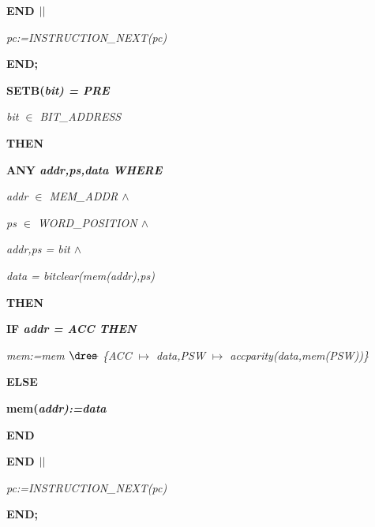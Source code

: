 \begin{sloppypar}
\hspace*{0.20in}\bf END  $\mbox{$\mid\mid$}$ 

\hspace*{0.20in}\it pc\rm :=\it INSTRUCTION\_NEXT\rm (\it pc\rm )

\hspace*{0.10in}\bf END\rm ;

\hspace*{0.10in}\bf SETB\rm (\it bit\rm ) \rm = \bf PRE

\hspace*{0.20in}\it bit $\in$  \it BIT\_ADDRESS

\hspace*{0.10in}\bf THEN

\hspace*{0.20in}\bf ANY \it addr\rm ,\it ps\rm ,\it data \bf WHERE

\hspace*{0.30in}\it addr $\in$  \it MEM\_ADDR  $\land$ 

\hspace*{0.30in}\it ps $\in$  \it WORD\_POSITION  $\land$ 

\hspace*{0.30in}\it addr\rm ,\it ps \rm = \it bit  $\land$ 

\hspace*{0.30in}\it data \rm = \it bitclear\rm (\it mem\rm (\it addr\rm )\rm ,\it ps\rm )

\hspace*{0.20in}\bf THEN

\hspace*{0.30in}\bf IF \it addr \rm = \it ACC \bf THEN

\hspace*{0.40in}\it mem\rm :=\it mem $\lover$ \rm \{\it ACC $\mapsto$ \it data\rm ,\it PSW $\mapsto$ \it accparity\rm (\it data\rm ,\it mem\rm (\it PSW\rm )\rm )\rm \}

\hspace*{0.30in}\bf ELSE

\hspace*{0.40in}\bf mem\rm (\it addr\rm )\rm :=\it data

\hspace*{0.30in}\bf END

\hspace*{0.20in}\bf END  $\mbox{$\mid\mid$}$ 

\hspace*{0.20in}\it pc\rm :=\it INSTRUCTION\_NEXT\rm (\it pc\rm )

\hspace*{0.10in}\bf END\rm ;


\end{sloppypar}
